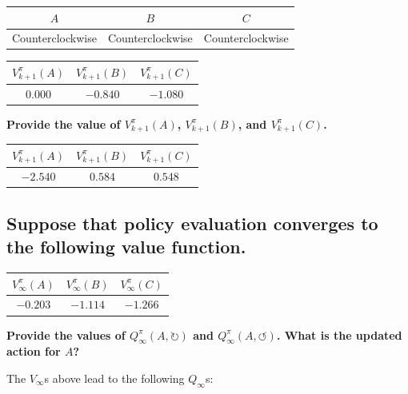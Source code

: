 \documentclass{homework}
\def\clockwise{\circlearrowright}
\def\counterclockwise{\circlearrowleft}
\begin{document}
\begin{table}[h!]
    \centering
    \begin{tabular}{c|c|c}
        \toprule
        $A$ & $B$ & $C$ \\
        \midrule
        Counterclockwise & Counterclockwise & Counterclockwise \\
        \bottomrule
    \end{tabular}
    \hfill
    \begin{tabular}{c|c|c}
        \toprule
        $V^{\pi}_{k+1}(A)$ & $V^{\pi}_{k+1}(B)$ & $V^{\pi}_{k+1}(C)$ \\
        \midrule
        $0.000$ & $-0.840$ & $-1.080$ \\
        \bottomrule
    \end{tabular}
\end{table}

\textbf{\large Provide the value of $V^{\pi}_{k+1}(A)$, $V^{\pi}_{k+1}(B)$, and $V^{\pi}_{k+1}(C)$.}
\begin{table}[h!]
    \centering
    \begin{tabular}{c|c|c}
        \toprule
        $V^{\pi}_{k+1}(A)$ & $V^{\pi}_{k+1}(B)$ & $V^{\pi}_{k+1}(C)$ \\
        \midrule
        $-2.540$ & $0.584$ & $0.548$ \\
        \bottomrule
    \end{tabular}
\end{table}

\clearpage
\subsection{Suppose that policy evaluation converges to the following value function.}

\begin{table}[h!]
    \centering
    \begin{tabular}{c|c|c}
        \toprule
        $V_{\infty}^{\pi}(A)$ & $V_{\infty}^{\pi}(B)$ & $V_{\infty}^{\pi}(C)$ \\
        \midrule
        $-0.203$ & $-1.114$ & $-1.266$ \\
        \bottomrule
    \end{tabular}
\end{table}

\textbf{\large Provide the values of $Q_{\infty}^{\pi}(A, \clockwise)$ and $Q_{\infty}^{\pi}(A, \counterclockwise)$. What is the updated action for $A$?}

The $V_{\infty}$s above lead to the following $Q_{\infty}$s:
\end{document}
